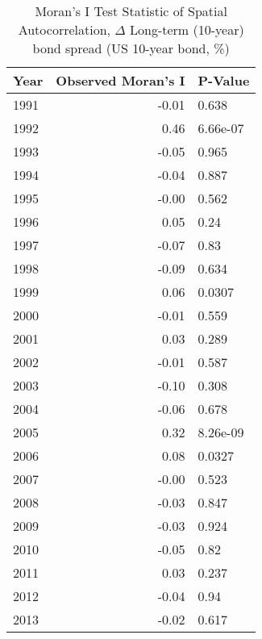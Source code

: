 \begin{table}[ht]
\centering
\caption{Moran's I Test Statistic of Spatial Autocorrelation, $\Delta$ Long-term (10-year) bond spread (US 10-year bond, \%)} 
\label{moransISpreads}
\begingroup\tiny
\begin{tabular}{lrl}
  \hline
Year & Observed Moran's I & P-Value \\ 
  \hline
1991 & -0.01 & 0.638 \\ 
  1992 & 0.46 & 6.66e-07 \\ 
  1993 & -0.05 & 0.965 \\ 
  1994 & -0.04 & 0.887 \\ 
  1995 & -0.00 & 0.562 \\ 
  1996 & 0.05 & 0.24 \\ 
  1997 & -0.07 & 0.83 \\ 
  1998 & -0.09 & 0.634 \\ 
  1999 & 0.06 & 0.0307 \\ 
  2000 & -0.01 & 0.559 \\ 
  2001 & 0.03 & 0.289 \\ 
  2002 & -0.01 & 0.587 \\ 
  2003 & -0.10 & 0.308 \\ 
  2004 & -0.06 & 0.678 \\ 
  2005 & 0.32 & 8.26e-09 \\ 
  2006 & 0.08 & 0.0327 \\ 
  2007 & -0.00 & 0.523 \\ 
  2008 & -0.03 & 0.847 \\ 
  2009 & -0.03 & 0.924 \\ 
  2010 & -0.05 & 0.82 \\ 
  2011 & 0.03 & 0.237 \\ 
  2012 & -0.04 & 0.94 \\ 
  2013 & -0.02 & 0.617 \\ 
   \hline
\end{tabular}
\endgroup
\end{table}
